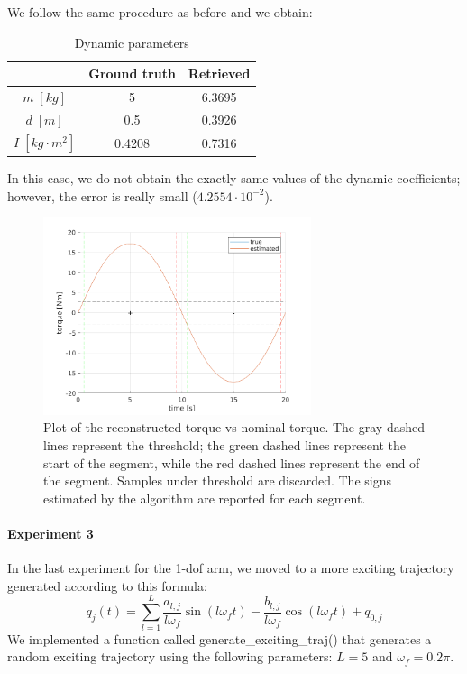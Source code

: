 \documentclass{article}
\begin{document}
We follow the same procedure as before and we obtain:

\begin{table}[!htbp]
\centering
\begin{tabular}{|c|cc|}
\hline
& Ground truth & Retrieved\\
\hline
$m\;[kg]$ & 5 & 6.3695\\ 
$d\;[m]$ & 0.5 & 0.3926\\
$I\;[kg\cdot m^2]$ & 0.4208 & 0.7316\\
\hline
\end{tabular}
\caption{Dynamic parameters}
\end{table}
\FloatBarrier

In this case, we do not obtain the exactly same values of the dynamic coefficients; however, the error is really small ($4.2554 \cdot 10^{-2}$).

\begin{figure}[!htbp]
\centering
\includegraphics[width=0.7\textwidth]{images/1-dof/results2.png}
\caption{Plot of the reconstructed torque vs nominal torque. The gray dashed lines represent the threshold; the green dashed lines represent the start of the segment, while the red dashed lines represent the end of the segment. Samples under threshold are discarded. The signs estimated by the algorithm are reported for each segment.}
\end{figure}
\FloatBarrier

\paragraph{Experiment 3} In the last experiment for the 1-dof arm, we moved to a more exciting trajectory generated according to this formula:
\[q_j(t) = \sum_{l=1}^{L}{\frac{ a_{l,j}}{ l\omega_f }\sin(l\omega_f t)-\frac{ b_{l,j}}{l\omega_f}\cos(l\omega_f t)+q_{0,j}}\]
We implemented a function called generate\_exciting\_traj() that generates a random exciting trajectory using the following parameters: $L = 5$ and $\omega_f = 0.2\pi$.
\end{document}
